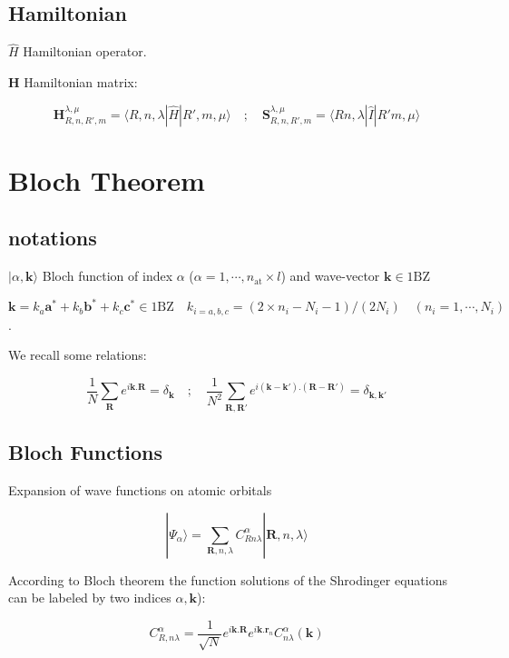 \documentclass{article}
\newcommand{\bra}[1]{\langle #1|}
\newcommand{\ket}[1]{|#1\rangle}
\newcommand{\op}[1]{\hat{#1}}
\begin{document}
\subsection{Hamiltonian}

\noindent
$\op{H}$ Hamiltonian operator.

\noindent
$\bm{H}$ Hamiltonian matrix:

\noindent
\[ \displaystyle \bm{H}_{R,n,R',m}^{\lambda, \mu}=\bra{ R,n,\lambda} \op{H} \ket{ R',m,\mu } \quad ;\quad
\bm{S}_{R,n,R',m}^{\lambda, \mu}=\bra{ Rn,\lambda} \op{I} \ket{R' m,\mu }\]


\section{Bloch Theorem}

\subsection{notations}

\noindent $\ket{\alpha, \mathbf{k} }$  Bloch function of index
$\alpha$ ($\alpha=1, \cdots, n_{\text{at}} \times l$) and wave-vector $\mathbf{k}\in \text{1BZ}$


\noindent
  $ \mathbf{k}=  k_a \mathbf{a}^*+k_b \mathbf{b}^*+k_c \mathbf{c}^* \in \mbox{1BZ}
\quad k_{i=a,b,c}= (2\times n_i -N_i -1)/(2 N_i) \quad (n_i=1,\cdots,N_i)$ .

\noindent
We recall some relations:

\[ \frac{1}{N}\sum_{\mathbf{R}} e^{i\mathbf{k}.\mathbf{R}}=\delta_{\mathbf{k}} 
\quad ; \quad
\frac{1}{N^2}\sum_{\mathbf{R},\mathbf{R}'} 
e^{i(\mathbf{k}-\mathbf{k'}).(\mathbf{R}-\mathbf{R}')}=\delta_{\mathbf{k}, 
\mathbf{k}'} \]


\subsection{Bloch Functions}

\noindent
Expansion of wave functions on atomic orbitals

\[\displaystyle \ket{\Psi_{\alpha}}=\sum_{\mathbf{R},n,\lambda} C_{R n  \lambda}^{\alpha} \ket{\mathbf{R},n,\lambda }\]


\noindent
According to Bloch theorem  the function solutions of the Shrodinger equations can be labeled by two indices $\alpha, \mathbf{k}$):

\[ \displaystyle C_{R,n \lambda}^{\alpha}=\frac{1}{\sqrt{N}}e^{i  \mathbf{k}.\mathbf{R}}e^{i \mathbf{k}.\mathbf{r}_n} C_{n \lambda}^{\alpha}(\mathbf{k})\]
\end{document}
